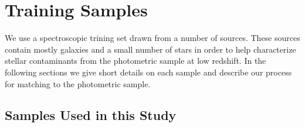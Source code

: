 \documentclass{emulateapj}
\begin{document}
\section{Training Samples} \label{sec:train}

We use a spectroscopic trining set drawn from a number of sources. These
sources contain mostly galaxies and a small number of stars in order to help
characterize stellar contaminants from the photometric sample at low redshift.
In the following sections we give short details on each sample and describe our
process for matching to the photometric sample.

\subsection{Samples Used in this Study} \label{sec:train:def}







\end{document}
